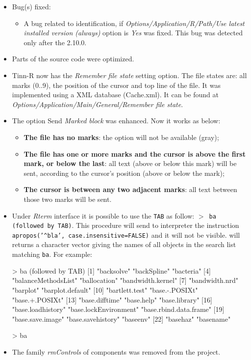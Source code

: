 \begin{itemize}
  \item Bug(s) fixed:
    \begin{itemize}
      \item A bug related to \RR{} identification, if
        \textit{Options/Application/R/Path/Use latest installed version (always)}
        option is \textit{Yes} was fixed. This bug was detected only after the
        \RR{} 2.10.0.
    \end{itemize}
  \item Parts of the source code were optimized.
  \item Tinn-R now has the \textit{Remember file state} setting option. The
    file states are: all marks (0..9), the position of the cursor and top line
    of the file. It was implemented using a XML database (Cache.xml). It can
    be found at \textit{Options/Application/Main/General/Remember file state}.
  \item The option Send \textit{Marked block} was enhanced. Now it works as below:
    \begin{itemize}
      \item \textbf{The file has no marks}: the option will not be available
        (gray);
      \item \textbf{The file has one or more marks and the cursor is above
          the first mark, or below the last}: all text (above or below 
        this mark) will be sent, according to the cursor's position (above
        or below the mark);
      \item \textbf{The cursor is between any two adjacent marks}: all text
        between those two marks will be sent.
    \end{itemize}
  \item Under \textit{Rterm} interface it is possible to use the \texttt{TAB} as
    follow: \texttt{$>$ ba (followed by TAB)}. This procedure will
    send to \RR{} interpreter the instruction
    \texttt{apropos('\^{}bla', case.insensitive=FALSE)} and it will not be
    visible. \RR{} will returns a character vector giving the names of all
    objects in the search list matching \texttt{ba}. For example:

    \begin{Scode}
      > ba (followed by TAB)
      [1] "backsolve"             "backSpline"            "bacteria"
      [4] "balanceMethodsList"    "ballocation"           "bandwidth.kernel"
      [7] "bandwidth.nrd"         "barplot"               "barplot.default"
      [10] "bartlett.test"         "base.-.POSIXt"         "base.+.POSIXt"
      [13] "base.difftime"         "base.help"             "base.library"
      [16] "base.loadhistory"      "base.lockEnvironment"  "base.rbind.data.frame"
      [19] "base.save.image"       "base.savehistory"      "baseenv"
      [22] "basehaz"               "basename"

      > ba
    \end{Scode}

  \item The family \textit{rmControls} of components was removed from the
    project.
\end{itemize}



